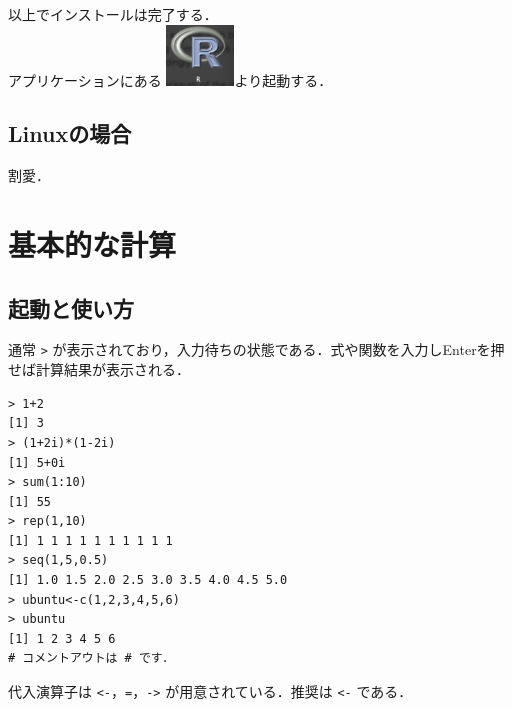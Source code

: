\documentclass[a4paper,10pt,fleqn]{jarticle}
\begin{document}
以上でインストールは完了する．\\

アプリケーションにある \includegraphics[width=1.8cm]{img/osx/osx012.eps}より起動する．
\subsection{Linuxの場合}
割愛．
\newpage
\section{基本的な計算}
\subsection{起動と使い方}
通常 \verb+>+ が表示されており，入力待ちの状態である．式や関数を入力しEnterを押せば計算結果が表示される．
\begin{breakbox}
\begin{verbatim}
> 1+2
[1] 3
> (1+2i)*(1-2i)
[1] 5+0i
> sum(1:10)
[1] 55
> rep(1,10)
[1] 1 1 1 1 1 1 1 1 1 1
> seq(1,5,0.5)
[1] 1.0 1.5 2.0 2.5 3.0 3.5 4.0 4.5 5.0
> ubuntu<-c(1,2,3,4,5,6)
> ubuntu
[1] 1 2 3 4 5 6
# コメントアウトは # です．
\end{verbatim}
\end{breakbox}
代入演算子は \verb+<-+，\verb+=+，\verb+->+ が用意されている．推奨は \verb+<-+ である．
\end{document}
